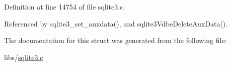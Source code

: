 Definition at line 14754 of file sqlite3.\+c.



Referenced by sqlite3\+\_\+set\+\_\+auxdata(), and sqlite3\+Vdbe\+Delete\+Aux\+Data().



The documentation for this struct was generated from the following file\+:\begin{DoxyCompactItemize}
\item 
libs/\hyperlink{sqlite3_8c}{sqlite3.\+c}\end{DoxyCompactItemize}
